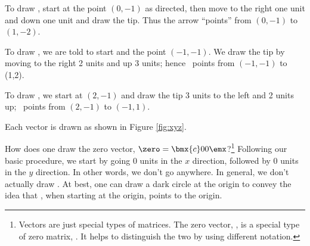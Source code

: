 {To draw \vx, start at the point $(0,-1)$ as directed, then move to the right one unit and down one unit and draw the tip. Thus the arrow ``points'' from $(0,-1)$ to $(1,-2)$.

To draw \vy, we are told to start and the point $(-1,-1)$. We draw the tip by moving to the right 2 units and up 3 units; hence \vy\ points from $(-1,-1)$ to (1,2).

To draw \vz, we start at $(2,-1)$ and draw the tip 3 units to the left and 2 units up; \vz\ points from $(2,-1)$ to $(-1,1)$.

Each vector is drawn as shown in Figure \ref{fig:xyz}.

\begin{myfigure}%
\begin{center}
\end{center}
\label{fig:xyz}
\end{myfigure}
{}\baselineskip}

\medskip

How does one draw the zero vector, $\zero =\bmx{c}0\\0\emx$?\footnote{Vectors are just special types of matrices. The zero vector, \zero, is a special type of zero matrix, \tto. It helps to distinguish the two by using different notation.} Following our basic procedure, we start by going 0 units in the $x$ direction, followed by 0 units in the $y$ direction. In other words, we don't go anywhere. 
In general, we don't actually draw \zero. At best, one can draw a dark circle at the origin to convey the idea that \zero, when starting at the origin, points to the origin.

